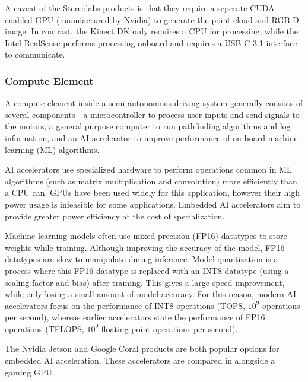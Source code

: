 \documentclass[12pt]{article}
\begin{document}
A caveat of the Stereolabs products is that they require a seperate CUDA enabled GPU (manufactured by Nvidia) to generate the point-cloud
and RGB-D image. In contrast, the Kinect DK only requires a CPU for processing, while the Intel RealSense performs processing onboard
and requires a USB-C 3.1 interface to communicate.

\subsubsection{Compute Element}
A compute element inside a semi-autonomous driving system generally consists of several components -
a microcontroller to process user inputs and
send signals to the motors, a general purpose computer to run pathfinding algorithms and log information,
and an AI accelerator to improve performance of on-board machine learning (ML) algorithms.

AI accelerators use specialized hardware to perform operations common in ML algorithms (such as matrix multiplication
and convolution) more efficiently than a CPU can. GPUs have been used widely for this application, however their high
power usage is infeasible for some applications. Embedded AI accelerators aim to provide greater power efficiency
at the cost of specialization.

Machine learning models often use mixed-precision (FP16) datatypes to store weights while training. Although improving the accuracy
of the model, FP16 datatypes are slow to manipulate during inference. Model quantization \cite{jacobQuantizationTrainingNeural2017} is a process where this FP16 datatype is replaced with an
INT8 datatype (using a scaling factor and bias) after training.
This gives a large speed improvement, while only losing a small amount
of model accuracy.
For this reason, modern AI accelerators focus on the performance of INT8 operations (TOPS, $10^9$ operations per second),
whereas earlier accelerators state the performance of FP16 operations (TFLOPS, $10^9$ floating-point
operations per second).

The Nvidia Jetson and Google Coral products are both popular options for embedded AI acceleration. These accelerators are compared
in  alongside a gaming GPU. 
\end{document}
